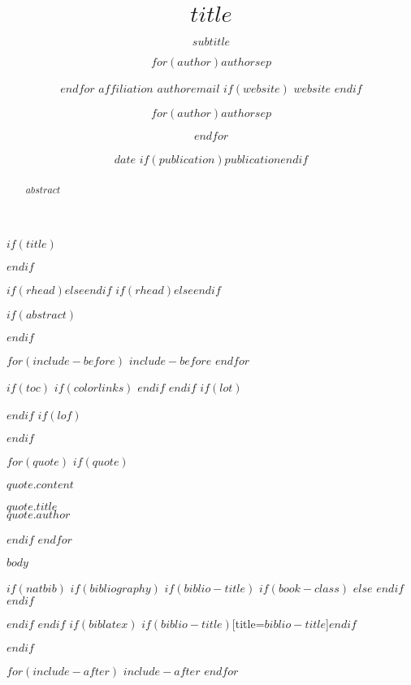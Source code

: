 \documentclass[$if(fontsize)$$fontsize$,$endif$$if(lang)$$babel-lang$,$endif$$if(papersize)$$papersize$paper,$endif$$for(classoption)$$classoption$$sep$,$endfor$nols, notitlepage, notoc]{tufte-handout}
\title{$title$}
\subtitle{$subtitle$}
\author{$for(author)$$author$$sep$ \and $endfor$
    \newline\small{$affiliation$}
    \newline\small{$authoremail$}
    $if(website)$
    \newline\small{$website$}
    $endif$}
\author{$for(author)$$author$$sep$ \and $endfor$}
\date{$date$
  $if(publication)$\newline\small{$publication$}$endif$}
\date{}
\begin{document}
$if(title)$
\maketitle
$endif$

\setlength{\epigraphwidth}{1.15\textwidth}


\pagestyle{fancy}
$if(rhead)$$else$\rhead{\footnotesize \thepage\ | \pageref{LastPage}}$endif$
{
  \fancyhf{}
  $if(rhead)$$else$\rhead{\footnotesize \thepage\ | \pageref{LastPage}}$endif$
  \renewcommand{\headrulewidth}{0pt}
}
\thispagestyle{firststyle}



$if(abstract)$
\begin{abstract}
\noindent $abstract$
\end{abstract}
$endif$

$for(include-before)$
$include-before$
$endfor$

$if(toc)$
{
$if(colorlinks)$
\hypersetup{linkcolor=$if(toccolor)$$toccolor$$else$black$endif$}
$endif$
\setcounter{tocdepth}{$toc-depth$}
\tableofcontents
}
$endif$
$if(lot)$
\listoftables
$endif$
$if(lof)$
\listoffigures
$endif$

$for(quote)$
$if(quote)$
\bigskip
\epigraph{$quote.content$}{$quote.title$\\\textsc{$quote.author$}}
\smallskip
$endif$
$endfor$


$body$

$if(natbib)$
$if(bibliography)$
$if(biblio-title)$
$if(book-class)$
\renewcommand\bibname{$biblio-title$}
$else$
\renewcommand\refname{$biblio-title$}
$endif$
$endif$


$endif$
$endif$
$if(biblatex)$
\printbibliography$if(biblio-title)$[title=$biblio-title$]$endif$

$endif$

$for(include-after)$
$include-after$
$endfor$
\end{document}
